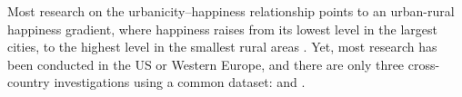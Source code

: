 \documentclass[11pt, letterpaper]{article}
\begin{document}


Most research on the urbanicity--happiness relationship points to an urban-rural happiness gradient, where happiness raises from its lowest level in the largest cities, to the highest level in the smallest rural areas
\citep[e.g.,][]{campbell76etal,aok11a, aok_brfss_city_cize16,aok20}. 
%
Yet, most research has been conducted in the US or Western Europe, and there are only three cross-country investigations using a common dataset: \citet{aokcities,easterlin10al} and \citet{burger20}.
\end{document}
